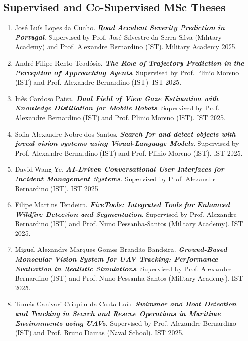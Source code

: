 \subsection{Supervised and Co-Supervised MSc
Theses}\label{supervised-and-co-supervised-msc-theses}

\begin{enumerate}
\def\labelenumi{\arabic{enumi}.}
\item
  José Luís Lopes da Cunho. \emph{\textbf{Road Accident Severity
  Prediction in Portugal}}. Supervised by Prof. José Silvestre da Serra
  Silva (Military Academy) and Prof. Alexandre Bernardino (IST).
  Military Academy 2025.
\item
  André Filipe Rento Teodósio. \emph{\textbf{The Role of Trajectory
  Prediction in the Perception of Approaching Agents}}. Supervised by
  Prof. Plinio Moreno (IST) and Prof. Alexandre Bernardino (IST). IST
  2025.
\item
  Inês Cardoso Paiva. \emph{\textbf{Dual Field of View Gaze Estimation
  with Knowledge Distillation for Mobile Robots}}. Supervised by Prof.
  Alexandre Bernardino (IST) and Prof. Plinio Moreno (IST). IST 2025.
\item
  Sofia Alexandre Nobre dos Santos. \emph{\textbf{Search for and detect
  objects with foveal vision systems using Visual-Language Models}}.
  Supervised by Prof. Alexandre Bernardino (IST) and Prof. Plinio Moreno
  (IST). IST 2025.
\item
  David Wang Ye. \emph{\textbf{AI-Driven Conversational User Interfaces
  for Incident Management Systems}}. Supervised by Prof. Alexandre
  Bernardino (IST). IST 2025.
\item
  Filipe Martins Tendeiro. \emph{\textbf{FireTools: Integrated Tools for
  Enhanced Wildfire Detection and Segmentation}}. Supervised by Prof.
  Alexandre Bernardino (IST) and Prof. Nuno Pessanha-Santos (Military
  Academy). IST 2025.
\item
  Miguel Alexandre Marques Gomes Brandão Bandeira.
  \emph{\textbf{Ground-Based Monocular Vision System for UAV Tracking:
  Performance Evaluation in Realistic Simulations}}. Supervised by Prof.
  Alexandre Bernardino (IST) and Prof. Nuno Pessanha-Santos (Military
  Academy). IST 2025.
\item
  Tomás Canivari Crispim da Costa Luís. \emph{\textbf{Swimmer and Boat
  Detection and Tracking in Search and Rescue Operations in Maritime
  Environments using UAVs}}. Supervised by Prof. Alexandre Bernardino
  (IST) and Prof. Bruno Damas (Naval School). IST 2025.

\end{enumerate}
